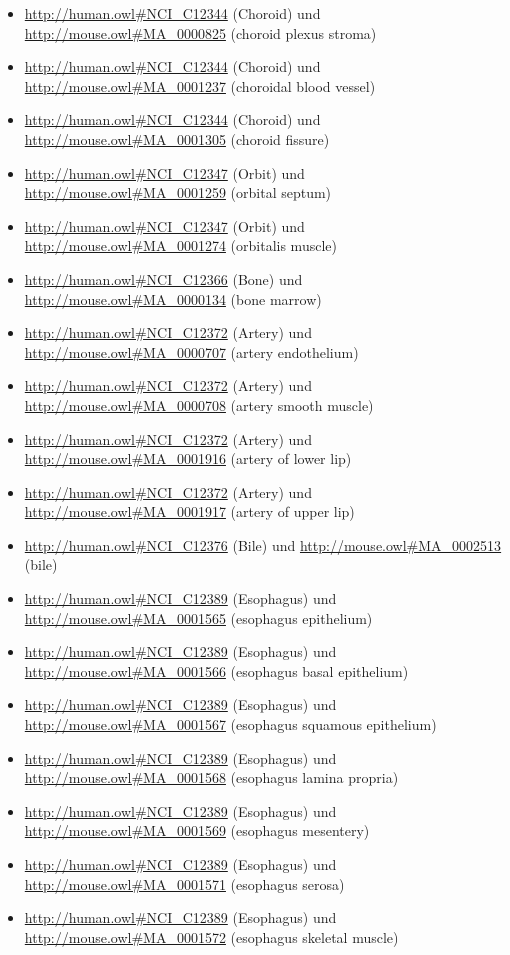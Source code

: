 \begin{itemize}
	\item \url{http://human.owl#NCI_C12344} (Choroid) und \url{http://mouse.owl#MA_0000825} (choroid plexus stroma)
	\item \url{http://human.owl#NCI_C12344} (Choroid) und \url{http://mouse.owl#MA_0001237} (choroidal blood vessel)
	\item \url{http://human.owl#NCI_C12344} (Choroid) und \url{http://mouse.owl#MA_0001305} (choroid fissure)
	\item \url{http://human.owl#NCI_C12347} (Orbit) und \url{http://mouse.owl#MA_0001259} (orbital septum)
	\item \url{http://human.owl#NCI_C12347} (Orbit) und \url{http://mouse.owl#MA_0001274} (orbitalis muscle)
	\item \url{http://human.owl#NCI_C12366} (Bone) und \url{http://mouse.owl#MA_0000134} (bone marrow)
	\item \url{http://human.owl#NCI_C12372} (Artery) und \url{http://mouse.owl#MA_0000707} (artery endothelium)
	\item \url{http://human.owl#NCI_C12372} (Artery) und \url{http://mouse.owl#MA_0000708} (artery smooth muscle)
	\item \url{http://human.owl#NCI_C12372} (Artery) und \url{http://mouse.owl#MA_0001916} (artery of lower lip)
	\item \url{http://human.owl#NCI_C12372} (Artery) und \url{http://mouse.owl#MA_0001917} (artery of upper lip)
	\item \url{http://human.owl#NCI_C12376} (Bile\textunderscoreDuct) und \url{http://mouse.owl#MA_0002513} (bile)
	\item \url{http://human.owl#NCI_C12389} (Esophagus) und \url{http://mouse.owl#MA_0001565} (esophagus epithelium)
	\item \url{http://human.owl#NCI_C12389} (Esophagus) und \url{http://mouse.owl#MA_0001566} (esophagus basal epithelium)
	\item \url{http://human.owl#NCI_C12389} (Esophagus) und \url{http://mouse.owl#MA_0001567} (esophagus squamous epithelium)
	\item \url{http://human.owl#NCI_C12389} (Esophagus) und \url{http://mouse.owl#MA_0001568} (esophagus lamina propria)
	\item \url{http://human.owl#NCI_C12389} (Esophagus) und \url{http://mouse.owl#MA_0001569} (esophagus mesentery)
	\item \url{http://human.owl#NCI_C12389} (Esophagus) und \url{http://mouse.owl#MA_0001571} (esophagus serosa)
	\item \url{http://human.owl#NCI_C12389} (Esophagus) und \url{http://mouse.owl#MA_0001572} (esophagus skeletal muscle)

\end{itemize}
